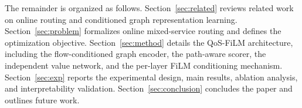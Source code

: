 The remainder is organized as follows. Section~\ref{sec:related} reviews related work on online routing and conditioned graph representation learning. Section~\ref{sec:problem} formalizes online mixed-service routing and defines the optimization objective. Section~\ref{sec:method} details the QoS-FiLM architecture, including the flow-conditioned graph encoder, the path-aware scorer, the independent value network, and the per-layer FiLM conditioning mechanism. Section~\ref{sec:exp} reports the experimental design, main results, ablation analysis, and interpretability validation. Section~\ref{sec:conclusion} concludes the paper and outlines future work.
